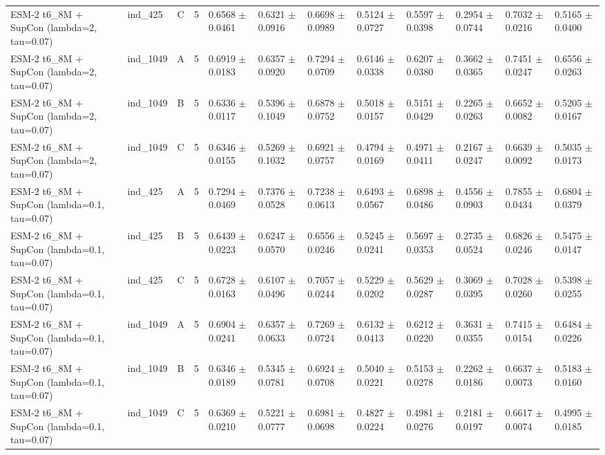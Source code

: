 \begin{table}[ht]
\begin{tabular}{llllllllllll}
ESM-2 t6\_8M + SupCon (lambda=2, tau=0.07) & ind\_425 & C & 5 & 0.6568 $\pm$ 0.0461 & 0.6321 $\pm$ 0.0916 & 0.6698 $\pm$ 0.0989 & 0.5124 $\pm$ 0.0727 & 0.5597 $\pm$ 0.0398 & 0.2954 $\pm$ 0.0744 & 0.7032 $\pm$ 0.0216 & 0.5165 $\pm$ 0.0400 \\
ESM-2 t6\_8M + SupCon (lambda=2, tau=0.07) & ind\_1049 & A & 5 & 0.6919 $\pm$ 0.0183 & 0.6357 $\pm$ 0.0920 & 0.7294 $\pm$ 0.0709 & 0.6146 $\pm$ 0.0338 & 0.6207 $\pm$ 0.0380 & 0.3662 $\pm$ 0.0365 & 0.7451 $\pm$ 0.0247 & 0.6556 $\pm$ 0.0263 \\
ESM-2 t6\_8M + SupCon (lambda=2, tau=0.07) & ind\_1049 & B & 5 & 0.6336 $\pm$ 0.0117 & 0.5396 $\pm$ 0.1049 & 0.6878 $\pm$ 0.0752 & 0.5018 $\pm$ 0.0157 & 0.5151 $\pm$ 0.0429 & 0.2265 $\pm$ 0.0263 & 0.6652 $\pm$ 0.0082 & 0.5205 $\pm$ 0.0167 \\
ESM-2 t6\_8M + SupCon (lambda=2, tau=0.07) & ind\_1049 & C & 5 & 0.6346 $\pm$ 0.0155 & 0.5269 $\pm$ 0.1032 & 0.6921 $\pm$ 0.0757 & 0.4794 $\pm$ 0.0169 & 0.4971 $\pm$ 0.0411 & 0.2167 $\pm$ 0.0247 & 0.6639 $\pm$ 0.0092 & 0.5035 $\pm$ 0.0173 \\
ESM-2 t6\_8M + SupCon (lambda=0.1, tau=0.07) & ind\_425 & A & 5 & 0.7294 $\pm$ 0.0469 & 0.7376 $\pm$ 0.0528 & 0.7238 $\pm$ 0.0613 & 0.6493 $\pm$ 0.0567 & 0.6898 $\pm$ 0.0486 & 0.4556 $\pm$ 0.0903 & 0.7855 $\pm$ 0.0434 & 0.6804 $\pm$ 0.0379 \\
ESM-2 t6\_8M + SupCon (lambda=0.1, tau=0.07) & ind\_425 & B & 5 & 0.6439 $\pm$ 0.0223 & 0.6247 $\pm$ 0.0570 & 0.6556 $\pm$ 0.0246 & 0.5245 $\pm$ 0.0241 & 0.5697 $\pm$ 0.0353 & 0.2735 $\pm$ 0.0524 & 0.6826 $\pm$ 0.0246 & 0.5475 $\pm$ 0.0147 \\
ESM-2 t6\_8M + SupCon (lambda=0.1, tau=0.07) & ind\_425 & C & 5 & 0.6728 $\pm$ 0.0163 & 0.6107 $\pm$ 0.0496 & 0.7057 $\pm$ 0.0244 & 0.5229 $\pm$ 0.0202 & 0.5629 $\pm$ 0.0287 & 0.3069 $\pm$ 0.0395 & 0.7028 $\pm$ 0.0260 & 0.5398 $\pm$ 0.0255 \\
ESM-2 t6\_8M + SupCon (lambda=0.1, tau=0.07) & ind\_1049 & A & 5 & 0.6904 $\pm$ 0.0241 & 0.6357 $\pm$ 0.0633 & 0.7269 $\pm$ 0.0724 & 0.6132 $\pm$ 0.0413 & 0.6212 $\pm$ 0.0220 & 0.3631 $\pm$ 0.0355 & 0.7415 $\pm$ 0.0154 & 0.6484 $\pm$ 0.0226 \\
ESM-2 t6\_8M + SupCon (lambda=0.1, tau=0.07) & ind\_1049 & B & 5 & 0.6346 $\pm$ 0.0189 & 0.5345 $\pm$ 0.0781 & 0.6924 $\pm$ 0.0708 & 0.5040 $\pm$ 0.0221 & 0.5153 $\pm$ 0.0278 & 0.2262 $\pm$ 0.0186 & 0.6637 $\pm$ 0.0073 & 0.5183 $\pm$ 0.0160 \\
ESM-2 t6\_8M + SupCon (lambda=0.1, tau=0.07) & ind\_1049 & C & 5 & 0.6369 $\pm$ 0.0210 & 0.5221 $\pm$ 0.0777 & 0.6981 $\pm$ 0.0698 & 0.4827 $\pm$ 0.0224 & 0.4981 $\pm$ 0.0276 & 0.2181 $\pm$ 0.0197 & 0.6617 $\pm$ 0.0074 & 0.4995 $\pm$ 0.0185 \\

\end{tabular}
\end{table}
